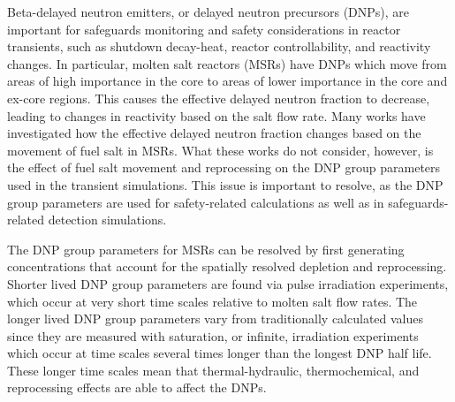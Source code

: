 Beta-delayed neutron emitters, or delayed neutron precursors (DNPs), are important for safeguards monitoring and safety considerations in reactor transients, such as shutdown decay-heat, reactor controllability, and reactivity changes.
In particular, molten salt reactors (MSRs) have DNPs which move from areas of high importance in the core to areas of lower importance in the core and ex-core regions.
This causes the effective delayed neutron fraction to decrease, leading to changes in reactivity based on the salt flow rate.
Many works have investigated how the effective delayed neutron fraction changes based on the movement of fuel salt in MSRs.
What these works do not consider, however, is the effect of fuel salt movement and reprocessing on the DNP group parameters used in the transient simulations.
This issue is important to resolve, as the DNP group parameters are used for safety-related calculations as well as in safeguards-related detection simulations.

The DNP group parameters for MSRs can be resolved by first generating concentrations that account for the spatially resolved depletion and reprocessing.
Shorter lived DNP group parameters are found via pulse irradiation experiments, which occur at very short time scales relative to molten salt flow rates.
The longer lived DNP group parameters vary from traditionally calculated values since they are measured with saturation, or infinite, irradiation experiments which occur at time scales several times longer than the longest DNP half life.
These longer time scales mean that thermal-hydraulic, thermochemical, and reprocessing effects are able to affect the DNPs.


